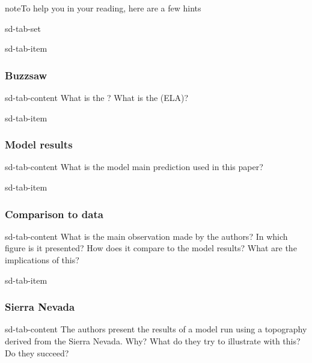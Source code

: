 \documentclass[letterpaper,10pt,english]{jupyterBook}
\begin{document}
\begin{sphinxadmonition}{note}{To help you in your reading, here are a few hints}

\begin{sphinxuseclass}{sd-tab-set}
\begin{sphinxuseclass}{sd-tab-item}\subsubsection*{Buzzsaw}

\begin{sphinxuseclass}{sd-tab-content}
\sphinxAtStartPar
What is the ? What is the  (ELA)?

\end{sphinxuseclass}
\end{sphinxuseclass}
\begin{sphinxuseclass}{sd-tab-item}\subsubsection*{Model results}

\begin{sphinxuseclass}{sd-tab-content}
\sphinxAtStartPar
What is the model main prediction used in this paper?

\end{sphinxuseclass}
\end{sphinxuseclass}
\begin{sphinxuseclass}{sd-tab-item}\subsubsection*{Comparison to data}

\begin{sphinxuseclass}{sd-tab-content}
\sphinxAtStartPar
What is the main observation made by the authors? In which figure is it presented? How does it compare to the model results? What are the implications of this?

\end{sphinxuseclass}
\end{sphinxuseclass}
\begin{sphinxuseclass}{sd-tab-item}\subsubsection*{Sierra Nevada}

\begin{sphinxuseclass}{sd-tab-content}
\sphinxAtStartPar
The authors present the results of a model run using a topography derived from the Sierra Nevada. Why? What do they try to illustrate with this? Do they succeed?


\end{sphinxuseclass}
\end{sphinxuseclass}
\end{sphinxuseclass}
\end{sphinxadmonition}
\end{document}
